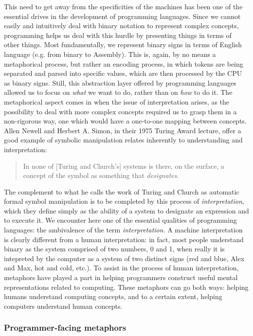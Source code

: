 This need to get away from the specificities of the machines has been one of the essential drives in the development of programming languages. Since we cannot easily and intuitively deal with binary notation to represent complex concepts, programming helps us deal with this hurdle by presenting things in terms of other things. Most fundamentally, we represent binary signs in terms of English language (e.g. from binary to Assembly). This is, again, by no means a metaphorical process, but rather an encoding process, in which tokens are being separated and parsed into specific values, which are then processed by the CPU as binary signs. Still, this abstraction layer offered by programming languages allowed us to focus on \emph{what} we want to do, rather than on \emph{how} to do it. The metaphorical aspect comes in when the issue of interpretation arises, as the possibility to deal with more complex concepts required us to grasp them in a non-rigorous way, one which would have a one-to-one mapping between concepts. Allen Newell and Herbert A. Simon, in their 1975 Turing Award lecture, offer a good example of symbolic manipulation relates inherently to understanding and interpretation:

\begin{quote}
    In none of [Turing and Church's] systems is there, on the surface, a concept of the symbol as something that \emph{designates}.
\end{quote}

The complement to what he calls the work of Turing and Church as automatic formal symbol manipulation is to be completed by this process of \emph{interpretation}, which they define simply as the ability of a system to designate an expression and to execute it. We encounter here one of the essential qualities of programming languages: the ambivalence of the term \emph{interpretation}. A machine interpretation is clearly different from a human interpretation: in fact, most people understand binary as the system comprised of two numbers, 0 and 1, when really it is intepreted by the computer as a system of two distinct signs (red and blue, Alex and Max, hot and cold, etc.). To assist in the process of human interpretation, metaphors have played a part in helping programmers construct useful mental representations related to computing. These metaphors can go both ways: helping humans understand computing concepts, and to a certain extent, helping computers understand human concepts.

\subsubsection{Programmer-facing metaphors}
\label{subsubsec:metaphors-programmers}

